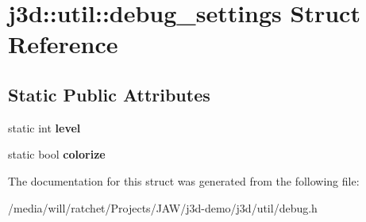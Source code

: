 \hypertarget{structj3d_1_1util_1_1debug__settings}{}\section{j3d\+:\+:util\+:\+:debug\+\_\+settings Struct Reference}
\label{structj3d_1_1util_1_1debug__settings}
\subsection*{Static Public Attributes}
\begin{DoxyCompactItemize}
\item 
\hypertarget{structj3d_1_1util_1_1debug__settings_a842fb78bcd25827651da2bd61e7f784b}{}static int {\bfseries level}\label{structj3d_1_1util_1_1debug__settings_a842fb78bcd25827651da2bd61e7f784b}

\item 
\hypertarget{structj3d_1_1util_1_1debug__settings_a136dd77c4a0cc13e503409ad8b122b12}{}static bool {\bfseries colorize}\label{structj3d_1_1util_1_1debug__settings_a136dd77c4a0cc13e503409ad8b122b12}

\end{DoxyCompactItemize}


The documentation for this struct was generated from the following file\+:\begin{DoxyCompactItemize}
\item 
/media/will/ratchet/\+Projects/\+J\+A\+W/j3d-\/demo/j3d/util/debug.\+h\end{DoxyCompactItemize}
